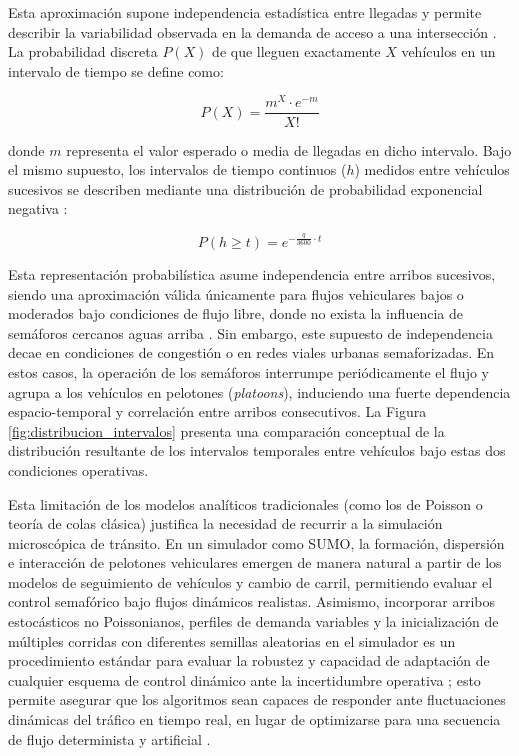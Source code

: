 Esta aproximación supone independencia estadística entre llegadas y permite describir la variabilidad observada en la demanda de acceso a una intersección \cite[p.~342]{calymayor}. La probabilidad discreta $P(X)$ de que lleguen exactamente $X$ vehículos en un intervalo de tiempo se define como:

\begin{equation}
    P(X) = \frac{m^X \cdot e^{-m}}{X!}
\end{equation}

donde $m$ representa el valor esperado o media de llegadas en dicho intervalo. Bajo el mismo supuesto, los intervalos de tiempo continuos ($h$) medidos entre vehículos sucesivos se describen mediante una distribución de probabilidad exponencial negativa \cite[p.~343]{calymayor}:

\begin{equation}
    P(h \ge t) = e^{-\frac{q}{3600} \cdot t}
\end{equation}

Esta representación probabilística asume independencia entre arribos sucesivos, siendo una aproximación válida únicamente para flujos vehiculares bajos o moderados bajo condiciones de flujo libre, donde no exista la influencia de semáforos cercanos aguas arriba \cite{calymayor}. Sin embargo, este supuesto de independencia decae en condiciones de congestión o en redes viales urbanas semaforizadas. En estos casos, la operación de los semáforos interrumpe periódicamente el flujo y agrupa a los vehículos en pelotones (\textit{platoons}), induciendo una fuerte dependencia espacio-temporal y correlación entre arribos consecutivos. La Figura \ref{fig:distribucion_intervalos} presenta una comparación conceptual de la distribución resultante de los intervalos temporales entre vehículos bajo estas dos condiciones operativas.

Esta limitación de los modelos analíticos tradicionales (como los de Poisson o teoría de colas clásica) justifica la necesidad de recurrir a la simulación microscópica de tránsito. En un simulador como SUMO, la formación, dispersión e interacción de pelotones vehiculares emergen de manera natural a partir de los modelos de seguimiento de vehículos y cambio de carril, permitiendo evaluar el control semafórico bajo flujos dinámicos realistas. Asimismo, incorporar arribos estocásticos no Poissonianos, perfiles de demanda variables y la inicialización de múltiples corridas con diferentes semillas aleatorias en el simulador es un procedimiento estándar para evaluar la robustez y capacidad de adaptación de cualquier esquema de control dinámico ante la incertidumbre operativa \cite{calymayor}; esto permite asegurar que los algoritmos sean capaces de responder ante fluctuaciones dinámicas del tráfico en tiempo real, en lugar de optimizarse para una secuencia de flujo determinista y artificial \cite{ite_handbook}.

